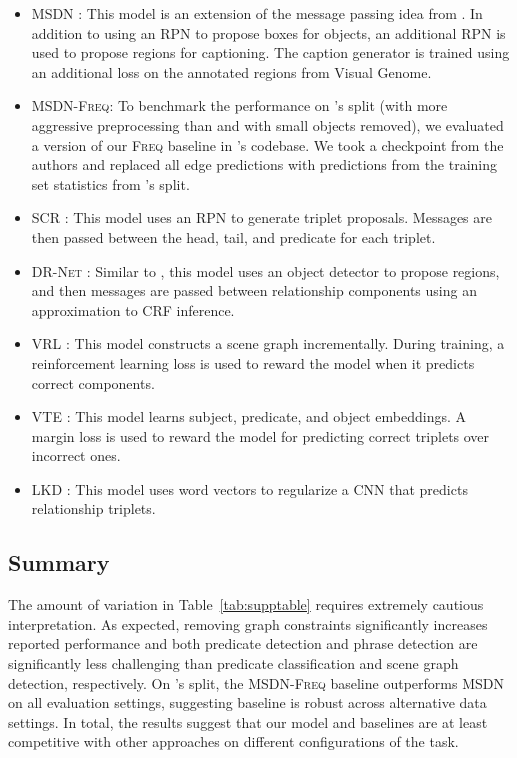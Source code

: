 \documentclass[10pt,twocolumn,letterpaper]{article}
\begin{document}
\begin{itemize}
    \item \textsc{MSDN} \cite{li2017msdn}: This model is an extension of the message passing idea from \cite{xu_scene_2017}. In addition to using an RPN to propose boxes for objects, an additional RPN is used to propose regions for captioning. The caption generator is trained using an additional loss on the annotated regions from Visual Genome.
    \item \textsc{MSDN-Freq}: To benchmark the performance on \cite{li2017msdn}'s split (with more aggressive preprocessing than \cite{xu_scene_2017} and with small objects removed), we evaluated a version of our \textsc{Freq} baseline in \cite{li2017msdn}'s codebase. We took a checkpoint from the authors and replaced all edge predictions with predictions from the training set statistics from  \cite{li2017msdn}'s split. 
    \item \textsc{SCR} \cite{li2017vip}: This model uses an RPN to generate triplet proposals. Messages are then passed between the head, tail, and predicate for each triplet.
    \item \textsc{DR-Net} \cite{Dai2017DetectingVR}: Similar to \cite{xu_scene_2017}, this model uses an object detector to propose regions, and then messages are passed between relationship components using an approximation to CRF inference. 
    \item \textsc{VRL} \cite{liang_deep_2017}: This model constructs a scene graph incrementally. During training, a reinforcement learning loss is used to reward the model when it predicts correct components.
    \item \textsc{VTE} \cite{Zhang2017VisualTE}: This model learns subject, predicate, and object embeddings. A margin loss is used to reward the model for predicting correct triplets over incorrect ones. \item \textsc{LKD} \cite{Yu_2017_ICCV}: This model uses word vectors to regularize a CNN that predicts relationship triplets.
\end{itemize}\subsection*{Summary}
The amount of variation in Table~\ref{tab:supptable} requires extremely cautious interpretation. 
As expected, removing graph constraints significantly increases reported performance and both predicate detection and phrase detection are significantly less challenging than predicate classification and scene graph detection, respectively.
On \cite{li2017msdn}'s split, the \textsc{MSDN-Freq} baseline outperforms \textsc{MSDN} on all evaluation settings, suggesting baseline is robust across alternative data settings.
In total, the results suggest that our model and baselines are at least competitive with other approaches on different configurations of the task.
\newpage


{\small


}
\end{document}
